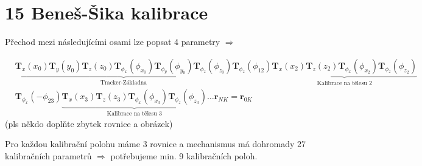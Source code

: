 \documentclass{article}
\begin{document}
	\section*{15 Beneš-Šika kalibrace}

	Přechod mezi následujícími osami lze popsat 4 parametry $\Rightarrow$

	\begin{align}
		&\underbrace{
			\bm{T}_x(x_0)\bm{T}_y(y_0)\bm{T}_z(z_0)\bm{T}_{\phi_x}(\phi_{x_0})\bm{T}_{\phi_y}(\phi_{y_0})\bm{T}_{\phi_z}(\phi_{z_0})
		}_{\text{Tracker-Základna}}
		\bm{T}_{\phi_z}(\phi_{12})
		\underbrace{
			\bm{T}_x(x_2)\bm{T}_z(z_2)\bm{T}_{\phi_x}(\phi_{x_2})\bm{T}_{\phi_z}(\phi_{z_2})
		}_{\text{Kalibrace na tělesu 2}}\\&
		\bm{T}_{\phi_x}(-\phi_{23})
		\underbrace{
			\bm{T}_x(x_3)\bm{T}_z(z_3)\bm{T}_{\phi_x}(\phi_{x_3})\bm{T}_{\phi_z}(\phi_{z_3})
		}_{\text{Kalibrace na tělesu 3}}
		\ldots
		\bm{r}_{N K} = \bm{r}_{0K}
	\end{align}
	(pls někdo doplňte zbytek rovnice a obrázek)

	Pro každou kalibrační polohu máme 3 rovnice a mechanismus má dohromady 27 kalibračních parametrů $\Rightarrow$ potřebujeme min. 9 kalibračních poloh.
\end{document}
